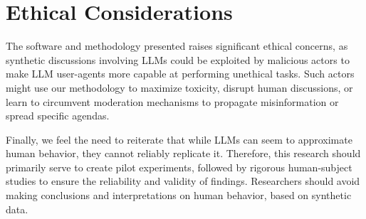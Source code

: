 %
\section{Ethical Considerations}

The software and methodology presented raises significant ethical concerns, as synthetic discussions involving \acp{LLM} could be exploited by malicious actors to make \ac{LLM} user-agents more capable at performing unethical tasks. Such actors might use our methodology to  maximize toxicity, disrupt human discussions, or learn to circumvent moderation mechanisms to propagate misinformation or spread specific agendas. 

Finally, we feel the need to reiterate that while \acp{LLM} can seem to approximate human behavior, they cannot reliably replicate it. Therefore, this research should primarily serve to create pilot experiments, followed by rigorous human-subject studies to ensure the reliability and validity of findings. Researchers should avoid making conclusions and interpretations on human behavior, based on synthetic data.